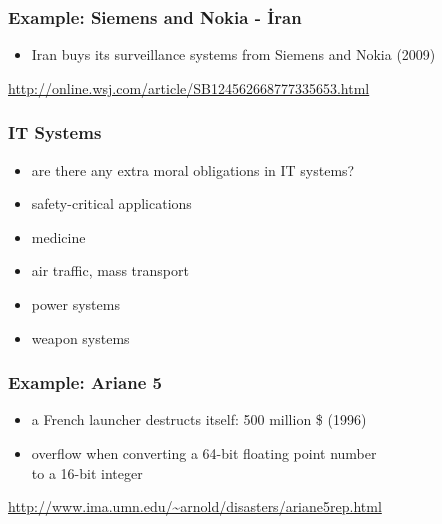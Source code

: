\documentclass[dvipsnames]{beamer}
\theoremstyle{plain}
\begin{document}
\begin{frame}
  \frametitle{Example: Siemens and Nokia - İran}

  \begin{center}
  \end{center}

  \begin{itemize}
    \item Iran buys its surveillance systems from Siemens and Nokia (2009)
  \end{itemize}

  \medskip
  \tiny{\url{http://online.wsj.com/article/SB124562668777335653.html}}\\
\end{frame}

\begin{frame}
  \frametitle{IT Systems}

  \begin{itemize}
    \item are there any extra moral obligations in IT systems?

    \bigskip
    \item safety-critical applications
    \smallskip
    \item medicine
    \item air traffic, mass transport
    \item power systems
    \item weapon systems
  \end{itemize}
\end{frame}

\begin{frame}
  \frametitle{Example: Ariane 5}

  \begin{center}
  \end{center}

  \begin{itemize}
    \item a French launcher destructs itself: 500 million \$ (1996)
    \item overflow when converting a 64-bit floating point number\\
      to a 16-bit integer
  \end{itemize}

  \medskip
  \tiny{\url{http://www.ima.umn.edu/~arnold/disasters/ariane5rep.html}}\\
\end{frame}
\end{document}
